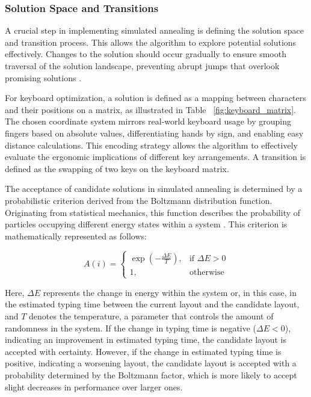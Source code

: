 \subsubsection{Solution Space and Transitions}
\noindent A crucial step in implementing simulated annealing is defining the solution space and transition process. This allows the algorithm to explore potential solutions effectively. Changes to the solution should occur gradually to ensure smooth traversal of the solution landscape, preventing abrupt jumps that overlook promising solutions \citep{SAOverview}.

For keyboard optimization, a solution is defined as a mapping between characters and their positions on a matrix, as illustrated in Table ~\ref{fig:keyboard_matrix}. The chosen coordinate system mirrors real-world keyboard usage by grouping fingers based on absolute values, differentiating hands by sign, and enabling easy distance calculations. This encoding strategy allows the algorithm to effectively evaluate the ergonomic implications of different key arrangements. A transition is defined as the swapping of two keys on the keyboard matrix. %

The acceptance of candidate solutions in simulated annealing is determined by a probabilistic criterion derived from the Boltzmann distribution function. Originating from statistical mechanics, this function describes the probability of particles occupying different energy states within a system \citep{harris2004introduction}. This criterion is mathematically represented as follows:

\begin{equation*}
A(i) = 
\left\{ 
\begin{array}{lr}
    \exp \left( -\frac{\Delta E}{T} \right), & \text{if } \Delta E > 0 \\
    1, & \text{otherwise}
\end{array}
\right.
\end{equation*}

\noindent Here, $\Delta E$ represents the change in energy within the system or, in this case, in the estimated typing time between the current layout and the candidate layout, and $T$ denotes the temperature, a parameter that controls the amount of randomness in the system. If the change in typing time is negative ($\Delta E < 0$), indicating an improvement in estimated typing time, the candidate layout is accepted with certainty. However, if the change in estimated typing time is positive, indicating a worsening layout, the candidate layout is accepted with a probability determined by the Boltzmann factor, which is more likely to accept slight decreases in performance over larger ones.


